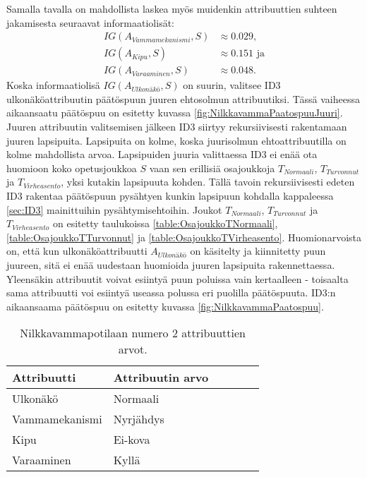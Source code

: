 \documentclass[12pt,finnish]{tktltiki2}
\theoremstyle{definition}
\theoremstyle{remark}
\begin{document}
Samalla tavalla on mahdollista laskea myös muidenkin attribuuttien suhteen jakamisesta seuraavat informaatiolisät:
\begin{equation*}
\begin{split}
IG(A_{Vammamekanismi},S) &\approx 0.029 \mbox{,}\\
IG(A_{Kipu},S) &\approx 0.151 \mbox{ ja}\\
IG(A_{Varaaminen},S) &\approx 0.048 \mbox{.}
\end{split}
\end{equation*}
Koska informaatiolisä $IG(A_{\textit{Ulkonäkö}},S)$ on suurin, valitsee ID3 ulkonäköattribuutin päätöspuun juuren ehtosolmun attribuutiksi.
Tässä vaiheessa aikaansaatu päätöspuu on esitetty kuvassa \ref{fig:NilkkavammaPaatospuuJuuri}. Juuren attribuutin valitsemisen
jälkeen ID3 siirtyy rekursiivisesti rakentamaan juuren lapsipuita. Lapsipuita on kolme, koska juurisolmun ehtoattribuutilla
on kolme mahdollista arvoa. Lapsipuiden juuria valittaessa ID3 ei enää ota huomioon koko opetusjoukkoa $S$ vaan sen
erillisiä osajoukkoja $T_{Normaali}$, $T_{Turvonnut}$ ja $T_{Virheasento}$, yksi kutakin lapsipuuta kohden. Tällä tavoin
rekursiivisesti edeten ID3 rakentaa päätöspuun pysähtyen kunkin lapsipuun kohdalla kappaleessa \ref{sec:ID3}
mainittuihin pysähtymisehtoihin. Joukot $T_{Normaali}$, $T_{Turvonnut}$ ja $T_{Virheasento}$ on esitetty taulukoissa
\ref{table:OsajoukkoTNormaali}, \ref{table:OsajoukkoTTurvonnut} ja \ref{table:OsajoukkoTVirheasento}.
Huomionarvoista on, että kun ulkonäköattribuutti $A_{\textit{Ulkonäkö}}$ on käsitelty ja kiinnitetty puun juureen, sitä ei enää
uudestaan huomioida juuren lapsipuita rakennettaessa. Yleensäkin attribuutit voivat esiintyä puun poluissa vain kertaalleen -
toisaalta sama attribuutti voi esiintyä useassa polussa eri puolilla päätöspuuta.
ID3:n aikaansaama päätöspuu on esitetty kuvassa \ref{fig:NilkkavammaPaatospuu}.




\begin{table}
\centering
\begin{tabular}{ | l | l | l | l | l | p{2cm} |} \hline
    \textbf{Attribuutti} & \textbf{Attribuutin arvo} \\ \hline
    Ulkonäkö & Normaali \\ \hline
    Vammamekanismi & Nyrjähdys \\ \hline
    Kipu & Ei-kova \\ \hline
    Varaaminen & Kyllä \\ \hline
\end{tabular}  
\caption{Nilkkavammapotilaan numero 2 attribuuttien arvot.}
\label{table:Nilkkavammapotilas2}
\end{table}
\end{document}
